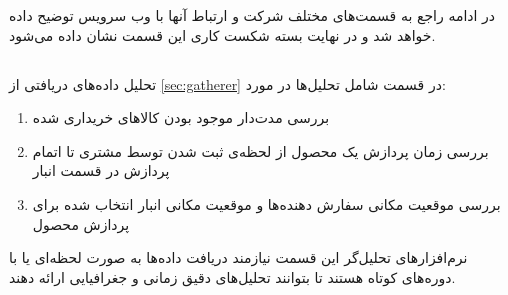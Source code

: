 در ادامه راجع به قسمت‌های مختلف شرکت و ارتباط آنها با وب سرویس توضیح داده خواهد شد و در نهایت بسته شکست کاری این قسمت نشان داده می‌شود.

\subsection{}\label{second-web-service:stock}
تحلیل‌ داده‌های دریافتی از 
\ref{sec:gatherer}
در قسمت 
شامل تحلیل‌ها در مورد:
\begin{enumerate}
\item\label{1}
بررسی مدت‌‌دار موجود بودن کالا‌های خریداری شده

\item\label{2}
بررسی زمان پردازش یک محصول از لحظه‌ی ثبت شدن توسط مشتری تا اتمام پردازش در قسمت انبار

\item\label{3}
بررسی موقعیت مکانی سفارش دهنده‌ها و موقعیت مکانی انبار انتخاب شده برای پردازش محصول

\end{enumerate}

نرم‌افزار‌های تحلیل‌گر این قسمت نیازمند دریافت داده‌ها به صورت لحظه‌ای یا با دوره‌های کوتاه هستند تا بتوانند تحلیل‌های دقیق زمانی و جغرافیایی ارائه دهند.

\subsection{}

\subsection{}

